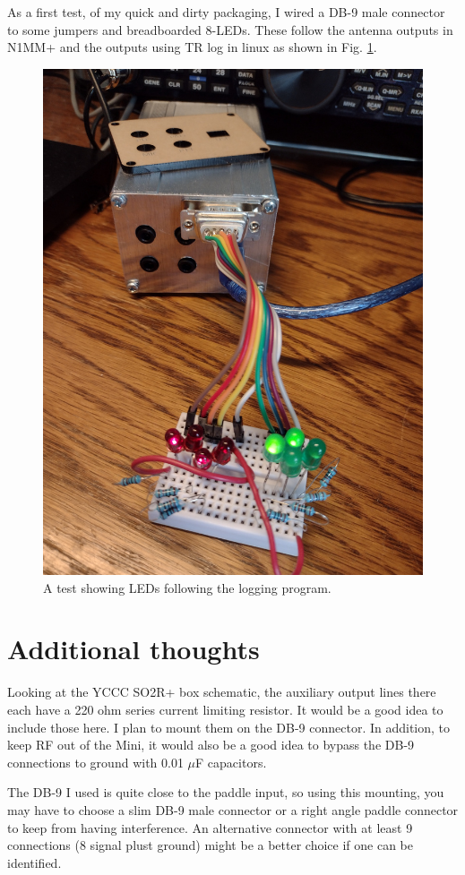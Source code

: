 \documentclass[12pt]{article}
\begin{document}
As a first test, of my quick and dirty packaging,
I wired a DB-9 male connector to some jumpers and
breadboarded 8-LEDs. These follow the antenna outputs in N1MM+ and
the outputs using TR log in linux as shown in Fig. \ref{f2.leds}.
\begin{figure}
\includegraphics[width=.5\textwidth]{led_test_1.jpg}
\caption{A test showing LEDs following the logging program.}
\label{f2.leds}
\end{figure}

\section{Additional thoughts}
Looking at the YCCC SO2R+ box schematic, the auxiliary output lines there
each have a 220 ohm series current limiting resistor. It would be a good
idea to include those here. I plan to mount them on the DB-9 connector.
In addition, to keep RF out of the Mini, it would also
be a good idea to bypass the DB-9 connections to ground
with 0.01 $\mu$F capacitors.

The DB-9 I used is quite close to the paddle input, so using this mounting,
you may have to choose a slim DB-9 male connector or a right angle
paddle connector to keep from having interference. An alternative connector
with at least 9 connections (8 signal plust ground)
might be a better choice if one can be identified.
\end{document}
